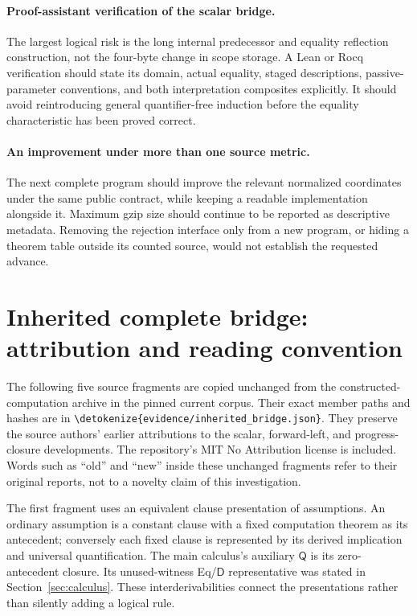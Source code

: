 \documentclass[11pt,letterpaper]{article}
\theoremstyle{definition}\newtheorem{definition}[theorem]{Definition}
\theoremstyle{remark}\newtheorem{remark}[theorem]{Remark}
\newcommand{\Q}{\mathsf Q}
\newcommand{\D}{\mathsf D}
\newcommand{\file}[1]{\expandafter\nolinkurl\expandafter{\detokenize{#1}}}
\begin{document}
\paragraph{Proof-assistant verification of the scalar bridge.}
The largest logical risk is the long internal predecessor and equality
reflection construction, not the four-byte change in scope storage.
A Lean or Rocq verification should state its domain, actual equality,
staged descriptions, passive-parameter conventions, and both
interpretation composites explicitly. It should avoid reintroducing
general quantifier-free induction before the equality characteristic
has been proved correct.

\paragraph{An improvement under more than one source metric.}
The next complete program should improve the relevant normalized
coordinates under the same public contract, while keeping a readable
implementation alongside it. Maximum gzip size should continue to be
reported as descriptive metadata. Removing the rejection interface
only from a new program, or hiding a theorem table outside its counted
source, would not establish the requested advance.

\appendix
\section*{Inherited complete bridge: attribution and reading convention}

The following five source fragments are copied unchanged from the
constructed-computation archive in the pinned current corpus. Their
exact member paths and hashes are in
\file{evidence/inherited_bridge.json}. They preserve the source authors'
earlier attributions to the scalar, forward-left, and progress-closure
developments. The repository's MIT No Attribution license is included.
Words such as ``old'' and ``new'' inside these unchanged fragments refer
to their original reports, not to a novelty claim of this investigation.

The first fragment uses an equivalent clause presentation of assumptions.
An ordinary assumption is a constant clause with a fixed computation
theorem as its antecedent; conversely each fixed clause is represented
by its derived implication and universal quantification. The main
calculus's auxiliary $\Q$ is its zero-antecedent closure. Its
unused-witness Eq/$\D$ representative was stated in
Section~\ref{sec:calculus}. These interderivabilities connect the
presentations rather than silently adding a logical rule.
\end{document}
